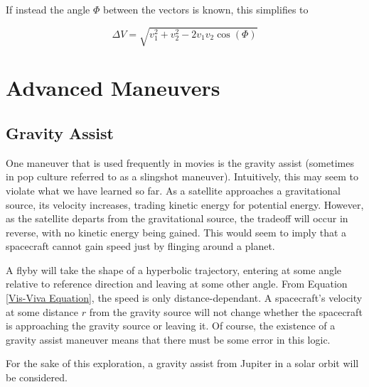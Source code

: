 \documentclass{article}
\begin{document}
If instead the angle $\varPhi$ between the vectors is known, this simplifies to

\begin{equation}
    \Delta V = \sqrt{v_1^2+v_2^2-2v_1v_2\cos(\varPhi)}
\end{equation}

\pagebreak
\section{Advanced Maneuvers}

\bigskip\bigskip
\subsection{Gravity Assist}

One maneuver that is used frequently in movies is the gravity assist (sometimes in pop culture referred to as a slingshot maneuver). Intuitively, this may seem to violate what we have learned so far. As a satellite approaches a gravitational source, its velocity increases, trading kinetic energy for potential energy. However, as the satellite departs from the gravitational source, the tradeoff will occur in reverse, with no kinetic energy being gained. This would seem to imply that a spacecraft cannot gain speed just by flinging around a planet.

A flyby will take the shape of a hyperbolic trajectory, entering at some angle relative to reference direction and leaving at some other angle. From Equation \eqref{Vis-Viva Equation}, the speed is only distance-dependant. A spacecraft's velocity at some distance $r$ from the gravity source will not change whether the spacecraft is approaching the gravity source or leaving it. Of course, the existence of a gravity assist maneuver means that there must be some error in this logic.

For the sake of this exploration, a gravity assist from Jupiter in a solar orbit will be considered.
\end{document}
